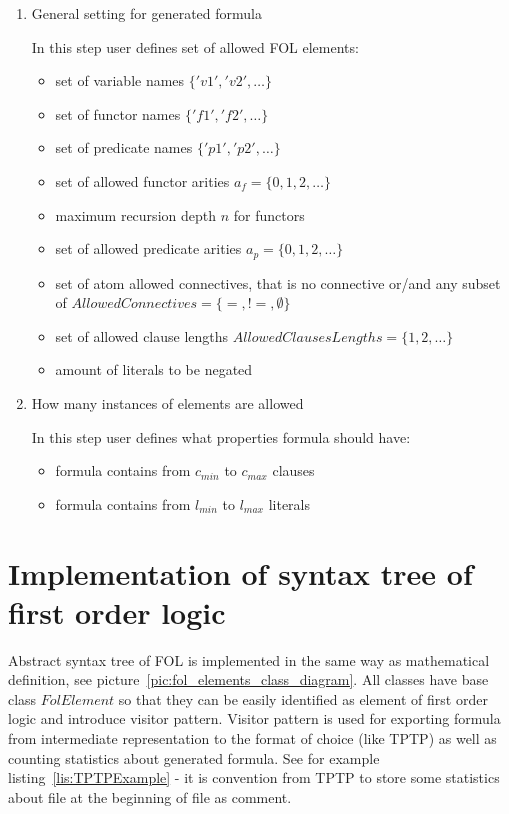 \begin{enumerate}
  \item General setting for generated formula

    In this step user defines set of allowed \gls{FOL} elements:
    \begin{itemize}
      \item set of variable names $\{'v1','v2',\dots\}$
      \item set of functor names $\{'f1','f2',\dots\}$
      \item set of predicate names $\{'p1','p2',\dots\}$
      \item set of allowed functor arities $a_f = \{0, 1, 2,\dots\}$
      \item maximum recursion depth $n$ for functors
      \item set of allowed predicate arities $a_p = \{0, 1, 2,\dots\}$
      \item set of atom allowed connectives, that is no connective or/and any subset of $AllowedConnectives = \{=, !=, \emptyset\}$
      \item set of allowed clause lengths $AllowedClausesLengths = \{1,2,\dots\}$
      \item amount of literals to be negated
    \end{itemize}

  \item How many instances of elements are allowed

    In this step user defines what properties formula should have:
    \begin{itemize}
      \item formula contains from $c_{min}$ to $c_{max}$ clauses
      \item formula contains from $l_{min}$ to $l_{max}$ literals
    \end{itemize}
\end{enumerate}

\section{Implementation of syntax tree of first order logic}
\label{sec:SyntaxTree}

Abstract syntax tree of \gls{FOL} is implemented in the same way as mathematical definition, see picture~\ref{pic:fol_elements_class_diagram}. All classes have base class $FolElement$ so that they can be easily identified as element of first order logic and introduce visitor pattern. Visitor pattern is used for exporting formula from intermediate representation to the format of choice (like \gls{TPTP}) as well as counting statistics about generated formula. See for example listing~\ref{lis:TPTPExample} - it is convention from TPTP to store some statistics about file at the beginning of file as comment.

